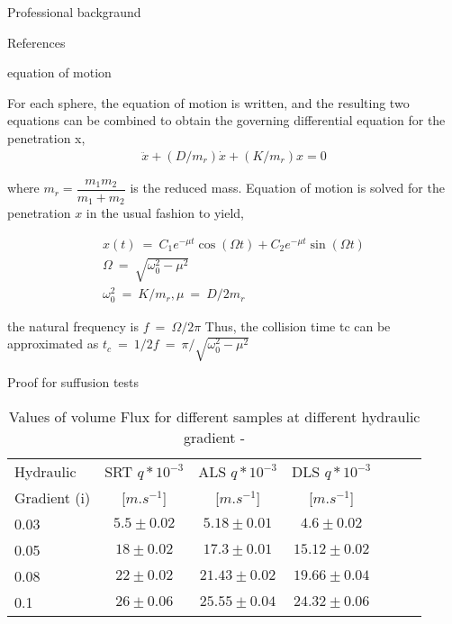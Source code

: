 \documentclass[10pt,xcolor=dvipsnames]{beamer}
\begin{document}
{\begin{frame}{Professional backgraund}
\begin{frame}[allowframebreaks]{References}
  
  

\end{frame}

\begin{frame}{equation of motion}

For each sphere, the equation of motion is written, and the resulting two equations can be combined to obtain the governing differential equation for the penetration x, 
\begin{align}
\ddot{x}+(D/m_{r})\dot{x}+(K/m_{r})x=0
\label{equ:motion}
\end{align}

where 
$
m_{r}=\dfrac{m_{1}m_{2}}{m_{1}+m_{2}}
$
is the reduced mass. Equation of motion is solved for the penetration $x$ in the usual fashion to yield,

\begin{align}
x(t)   \: = \: C_{1}e^{-\mu t}\cos(\Omega t) + C_{2}e^{-\mu t}\sin(\Omega t)\\
\Omega \: = \: \sqrt{\omega_{0}^{2} - \mu^{2}}\\
\omega_{0}^{2} \: = \: K/m_{r} , \mu\: = \:D/2m_{r}
\end{align}

the natural frequency is $f\: = \:\Omega / 2\pi$ Thus, the collision time tc can be approximated as $t_{c} \: = \: 1/2f \: = \:\pi / \sqrt{\omega_{0}^{2} - \mu^{2}}$

\end{frame}
\begin{frame}{Proof for suffusion tests }


\begin{table}[b]

{
\scriptsize
\begin{center}
\begin{tabular}{lcccccc}
Hydraulic     & SRT $q*10^{-3}$ & ALS $q*10^{-3}$  & DLS $q*10^{-3}$ \\
Gradient (i)  & [$m.s^{-1}$]    & [$m.s^{-1}$]    & [$m.s^{-1}$] \\\hline
0.03          & $5.5\pm 0.02 $  & $5.18\pm 0.01$  & $4.6\pm 0.02$ \\
0.05          & $18\pm 0.02 $  & $17.3\pm 0.01$   & $15.12\pm 0.02$ \\
0.08          & $22\pm 0.02 $  & $21.43\pm 0.02$  & $19.66\pm 0.04$ \\
0.1          &  $26\pm 0.06 $  & $25.55\pm 0.04$  & $24.32\pm 0.06$ \\\hline
\end{tabular}
    \label{tab:Values of Volume Flux}  
    \caption{Values of volume Flux for different samples at different hydraulic gradient - }
\end{center}
}%
\end{table}


\end{frame}
\end{frame}}
\end{document}

